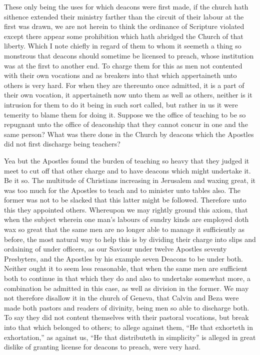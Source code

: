 These only being the uses for which deacons were first made, if the church hath sithence extended their ministry farther than the circuit of their labour at the first was drawn, we are not herein to think the ordinance of Scripture violated except there appear some prohibition which hath abridged the Church of that liberty. Which I note chiefly in regard of them to whom it seemeth a thing so monstrous that deacons should sometime be licensed to preach, whose institution was at the first to another end. To charge them for this as  men not contented with their own vocations and as breakers into that which appertaineth unto others is very hard. For when they are thereunto once admitted, it is a part of their own vocation, it appertaineth now unto them as well as others, neither is it intrusion for them to do it being in such sort called, but rather in us it were temerity to blame them for doing it. Suppose we the office of teaching to be so repugnant unto the office of deaconship that they cannot concur in one and the same person? What was there done in the Church by deacons which the Apostles did not first discharge being teachers?

Yea but the Apostles found the burden of teaching so heavy that they judged it meet to cut off that other charge and to have deacons which might undertake it. Be it so. The multitude of Christians increasing in Jerusalem and waxing great, it was too much for the Apostles to teach and to minister unto tables also. The former was not to be slacked that this latter might be followed. Therefore unto this they appointed others. Whereupon we may rightly ground this axiom, that when the subject wherein one man’s labours of sundry kinds are employed doth wax so great that the same men are no  longer able to manage it sufficiently as before, the most natural way to help this is by dividing their charge into slips and ordaining of under officers, as our Saviour under twelve Apostles seventy Presbyters, and the Apostles by his example seven Deacons to be under both. Neither ought it to seem less reasonable, that when the same men are sufficient both to continue in that which they do and also to undertake somewhat more, a combination be admitted in this case, as well as division in the former. We may not therefore disallow it in the church of Geneva, that Calvin and Beza were made both pastors and readers of divinity, being men so able to discharge both. To say they did not content themselves with their pastoral vocations, but break into that which belonged to others; to allege against them, “He that exhorteth in exhortation,” as against us, “He that distributeth in simplicity” is alleged in great dislike of granting license for deacons to preach, were very hard.

